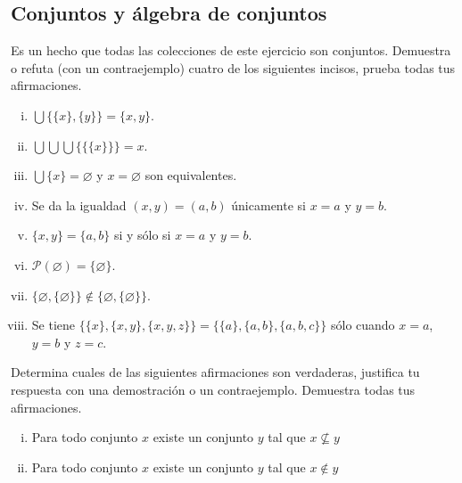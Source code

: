 \documentclass[10pt]{article}
\newcommand{\set}[1]{\{#1\}}
\newcommand{\ms}[1]{\mathscr{#1}}
\renewcommand{\emptyset}{\varnothing}
\begin{document}
    
    \subsection*{Conjuntos y álgebra de conjuntos}
    

    \begin{exercise}
        Es un hecho que todas las colecciones de este ejercicio son conjuntos. Demuestra o refuta (con un contraejemplo) cuatro de los siguientes incisos, prueba todas tus afirmaciones.
        \begin{multicols}{2}
            \begin{enumerate}[i)]
                \item \( \bigcup \set{\set{x},\set{y}}=\set{x,y} \).
                \item \( \bigcup\bigcup\bigcup\set{\set{\set{x}}} = x \).
                \item \( \bigcup \set{x}=\emptyset \) y $x=\emptyset$ son equivalentes.
                \item Se da la igualdad \( (x,y)=(a,b) \) únicamente si \(x=a\) y \(y=b\).
                \item \( \set{x,y}=\set{a,b} \) si y sólo si $x=a$ y $y=b$.
                \item \( \ms{P}(\emptyset)=\set{\emptyset} \).
                \item \( \set{\emptyset,\set{\emptyset}} \notin \set{\emptyset,\set{\emptyset}} \).
                \item Se tiene \( \set{\set{x},\set{x,y},\set{x,y,z}} = \set{\set{a},\set{a,b},\set{a,b,c}} \) sólo cuando \(x=a\), \(y=b\) y \(z=c\).
                
            \end{enumerate}
        \end{multicols}
    \end{exercise}

    \begin{exercise}
        Determina cuales de las siguientes afirmaciones son verdaderas, justifica tu respuesta con una demostración o un contraejemplo. Demuestra todas tus afirmaciones.
        \begin{enumerate}[i)]
            \item Para todo conjunto \(x\) existe un conjunto \(y\) tal que \(x \not\subseteq y\)
            \item Para todo conjunto \(x\) existe un conjunto \(y\) tal que \(x \notin y\)
        \end{enumerate}
    \end{exercise}
\end{document}
